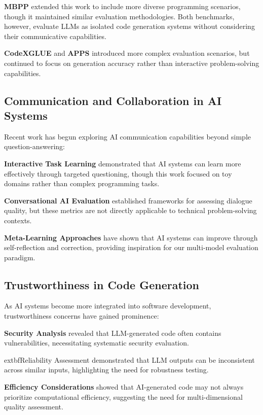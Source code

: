 \documentclass[conference]{IEEEtran}
\begin{document}
\textbf{MBPP} \cite{austin2021program} extended this work to include more diverse programming scenarios, though it maintained similar evaluation methodologies. Both benchmarks, however, evaluate LLMs as isolated code generation systems without considering their communicative capabilities.

\textbf{CodeXGLUE} \cite{lu2021codexglue} and \textbf{APPS} \cite{hendrycks2021measuring} introduced more complex evaluation scenarios, but continued to focus on generation accuracy rather than interactive problem-solving capabilities.

\subsection{Communication and Collaboration in AI Systems}

Recent work has begun exploring AI communication capabilities beyond simple question-answering:

\textbf{Interactive Task Learning} \cite{wang2021towards} demonstrated that AI systems can learn more effectively through targeted questioning, though this work focused on toy domains rather than complex programming tasks.

\textbf{Conversational AI Evaluation} \cite{adiwardana2020towards} established frameworks for assessing dialogue quality, but these metrics are not directly applicable to technical problem-solving contexts.

\textbf{Meta-Learning Approaches} \cite{finn2017model} have shown that AI systems can improve through self-reflection and correction, providing inspiration for our multi-model evaluation paradigm.

\subsection{Trustworthiness in Code Generation}

As AI systems become more integrated into software development, trustworthiness concerns have gained prominence:

\textbf{Security Analysis} \cite{pearce2022asleep} revealed that LLM-generated code often contains vulnerabilities, necessitating systematic security evaluation.

	extbf{Reliability Assessment} \cite{chen2021evaluating} demonstrated that LLM outputs can be inconsistent across similar inputs, highlighting the need for robustness testing.

\textbf{Efficiency Considerations} \cite{nijkamp2022codegen} showed that AI-generated code may not always prioritize computational efficiency, suggesting the need for multi-dimensional quality assessment.
\end{document}
